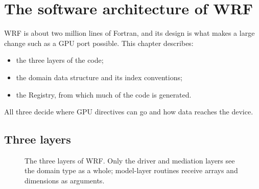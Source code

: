 \chapter{The software architecture of WRF}\label{ch:arch}

WRF is about two million lines of Fortran, and its design is what makes a large change such as a GPU port
possible. This chapter describes:
\begin{itemize}
  \item the three layers of the code;
  \item the domain data structure and its index conventions;
  \item the Registry, from which much of the code is generated.
\end{itemize}
All three decide where GPU directives can go and how data reaches the device.

\section{Three layers}

\begin{figure}[ht]
\centering
{}
\caption{The three layers of WRF. Only the driver and mediation layers see the domain type as a whole; model-layer
routines receive arrays and dimensions as arguments.}
\label{fig:layers}
\end{figure}


